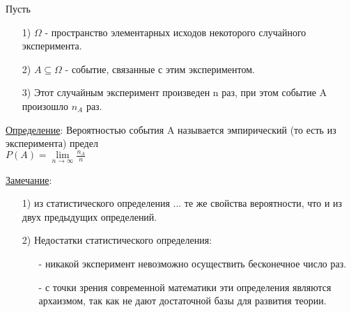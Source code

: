 
Пусть 
\begin{enumerate}
	\item[1)]
	$\Omega$ - пространство элементарных исходов некоторого случайного эксперимента.
	
	\item[2)]
	$A \subseteq \Omega$ - событие, связанные с этим экспериментом.
	
	\item[3)]
	Этот случайным эксперимент произведен n раз, при этом событие A произошло $n_A$ раз.
\end{enumerate}

\underline{Определение}: Вероятностью события A называется эмпирический (то есть из эксперимента) предел \\
$P(A) = \lim\limits_{n \rightarrow \infty} \frac{n_A}{n}$

\underline{Замечание}:
\begin{enumerate}
	\item[1)] 
	из статистического определения ... те же свойства вероятности, что и из двух предыдущих определений.
	
	\item[2)]
	Недостатки статистического определения:
	\begin{enumerate}
		\item[-]
		никакой эксперимент невозможно осуществить бесконечное число раз.
		
		\item[-]
		с точки зрения современной математики эти определения являются архаизмом, так как не дают достаточной базы для развития теории.
	\end{enumerate}
\end{enumerate}









































